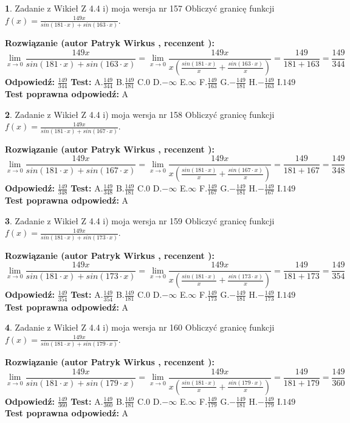 \documentclass[12pt, a4paper]{article}
\theoremstyle{definition} %
\newtheorem{zad}{}
\newcommand{\zadStart}[1]{\begin{zad}#1\newline}
\newcommand{\zadStop}{\end{zad}}
\newcommand{\rozwStart}[2]{\noindent \textbf{Rozwiązanie (autor #1 , recenzent #2): }\newline}
\newcommand{\rozwStop}{\newline}
\newcommand{\odpStart}{\noindent \textbf{Odpowiedź:}\newline}
\newcommand{\odpStop}{\newline}
\newcommand{\testStart}{\noindent \textbf{Test:}\newline}
\newcommand{\testStop}{\newline}
\newcommand{\kluczStart}{\noindent \textbf{Test poprawna odpowiedź:}\newline}
\newcommand{\kluczStop}{\newline}
\begin{document}
\zadStart{Zadanie z Wikieł Z 4.4 i) moja wersja nr 157}
Obliczyć granicę funkcji $f(x)=\frac{149x}{sin(181\cdot x) +sin(163\cdot x)}$.
\zadStop
\rozwStart{Patryk Wirkus}{}
$$\lim\limits_{x\to 0}\frac{149x}{sin(181\cdot x) +sin(163\cdot x)}=\lim\limits_{x\to 0}\frac{149x}{x(\frac{sin(181\cdot x)}{x}+\frac{sin(163\cdot x)}{x})}=\frac{149}{181+163} = \frac{149}{344}$$
\rozwStop
\odpStart
$\frac{149}{344}$
\odpStop
\testStart
A.$\frac{149}{344}$
B.$\frac{149}{181}$
C.$0$
D.$-\infty$
E.$\infty$
F.$\frac{149}{163}$
G.$-\frac{149}{181}$
H.$-\frac{149}{163}$
I.$149$
\testStop
\kluczStart
A
\kluczStop



\zadStart{Zadanie z Wikieł Z 4.4 i) moja wersja nr 158}
Obliczyć granicę funkcji $f(x)=\frac{149x}{sin(181\cdot x) +sin(167\cdot x)}$.
\zadStop
\rozwStart{Patryk Wirkus}{}
$$\lim\limits_{x\to 0}\frac{149x}{sin(181\cdot x) +sin(167\cdot x)}=\lim\limits_{x\to 0}\frac{149x}{x(\frac{sin(181\cdot x)}{x}+\frac{sin(167\cdot x)}{x})}=\frac{149}{181+167} = \frac{149}{348}$$
\rozwStop
\odpStart
$\frac{149}{348}$
\odpStop
\testStart
A.$\frac{149}{348}$
B.$\frac{149}{181}$
C.$0$
D.$-\infty$
E.$\infty$
F.$\frac{149}{167}$
G.$-\frac{149}{181}$
H.$-\frac{149}{167}$
I.$149$
\testStop
\kluczStart
A
\kluczStop



\zadStart{Zadanie z Wikieł Z 4.4 i) moja wersja nr 159}
Obliczyć granicę funkcji $f(x)=\frac{149x}{sin(181\cdot x) +sin(173\cdot x)}$.
\zadStop
\rozwStart{Patryk Wirkus}{}
$$\lim\limits_{x\to 0}\frac{149x}{sin(181\cdot x) +sin(173\cdot x)}=\lim\limits_{x\to 0}\frac{149x}{x(\frac{sin(181\cdot x)}{x}+\frac{sin(173\cdot x)}{x})}=\frac{149}{181+173} = \frac{149}{354}$$
\rozwStop
\odpStart
$\frac{149}{354}$
\odpStop
\testStart
A.$\frac{149}{354}$
B.$\frac{149}{181}$
C.$0$
D.$-\infty$
E.$\infty$
F.$\frac{149}{173}$
G.$-\frac{149}{181}$
H.$-\frac{149}{173}$
I.$149$
\testStop
\kluczStart
A
\kluczStop



\zadStart{Zadanie z Wikieł Z 4.4 i) moja wersja nr 160}
Obliczyć granicę funkcji $f(x)=\frac{149x}{sin(181\cdot x) +sin(179\cdot x)}$.
\zadStop
\rozwStart{Patryk Wirkus}{}
$$\lim\limits_{x\to 0}\frac{149x}{sin(181\cdot x) +sin(179\cdot x)}=\lim\limits_{x\to 0}\frac{149x}{x(\frac{sin(181\cdot x)}{x}+\frac{sin(179\cdot x)}{x})}=\frac{149}{181+179} = \frac{149}{360}$$
\rozwStop
\odpStart
$\frac{149}{360}$
\odpStop
\testStart
A.$\frac{149}{360}$
B.$\frac{149}{181}$
C.$0$
D.$-\infty$
E.$\infty$
F.$\frac{149}{179}$
G.$-\frac{149}{181}$
H.$-\frac{149}{179}$
I.$149$
\testStop
\kluczStart
A
\kluczStop
\end{document}
